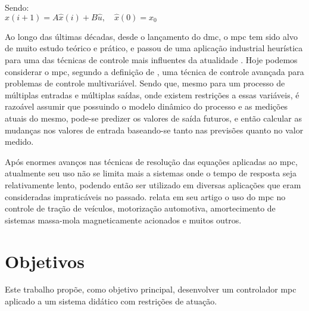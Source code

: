\noindent
Sendo: 	\\
$ \hat{x}(i+1) = A\hat{x}(i) + B\hat{u}, \quad \hat{x}(0) = x_0 $

Ao longo das últimas décadas, desde o lançamento do \acrshort{dmc}, o \acrshort{mpc}
tem sido alvo de muito estudo teórico e prático, e passou de uma aplicação industrial
heurística para uma das técnicas de controle mais influentes da atualidade \cite{Lee2011}.
Hoje podemos considerar o \acrshort{mpc}, segundo a definição de ,
uma técnica de controle avançada para problemas de controle multivariável. Sendo que,
mesmo para um processo de múltiplas entradas e múltiplas saídas, onde existem restrições a
essas variáveis, é razoável assumir que possuindo o modelo dinâmico do processo e as medições
atuais do mesmo, pode-se predizer os valores de saída futuros, e então calcular as mudanças nos
valores de entrada baseando-se tanto nas previsões quanto no valor medido.

Após enormes avanços nas técnicas de resolução das equações aplicadas ao \acrshort{mpc},
atualmente seu uso não se limita mais a sistemas onde o tempo de resposta seja relativamente
lento, podendo então ser utilizado em diversas aplicações que eram consideradas impraticáveis
no passado.  relata em seu artigo o uso do \acrshort{mpc} no controle
de tração de veículos, motorização automotiva, amortecimento de sistemas massa-mola magneticamente
acionados e muitos outros.


\section{Objetivos}
\label{sec:objetivos}

Este trabalho propõe, como objetivo principal, desenvolver um controlador \acrshort{mpc}
aplicado a um sistema didático com restrições de atuação.

